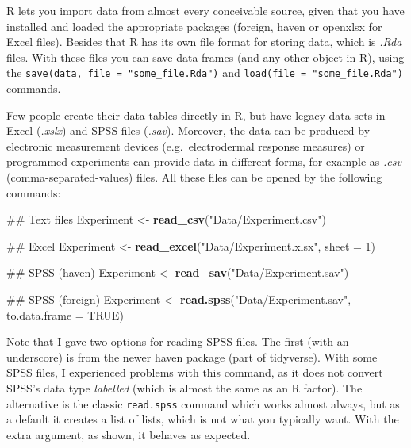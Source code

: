 \documentclass[]{svmono}
\newenvironment{Shaded}{\begin{snugshade}}{\end{snugshade}}
\newcommand{\KeywordTok}[1]{\textcolor[rgb]{0.13,0.29,0.53}{\textbf{#1}}}
\newcommand{\DataTypeTok}[1]{\textcolor[rgb]{0.13,0.29,0.53}{#1}}
\newcommand{\DecValTok}[1]{\textcolor[rgb]{0.00,0.00,0.81}{#1}}
\newcommand{\StringTok}[1]{\textcolor[rgb]{0.31,0.60,0.02}{#1}}
\newcommand{\OtherTok}[1]{\textcolor[rgb]{0.56,0.35,0.01}{#1}}
\newcommand{\NormalTok}[1]{#1}
\theoremstyle{definition}
\theoremstyle{definition}
\theoremstyle{definition}
\theoremstyle{remark}
\begin{document}
R lets you import data from almost every conceivable source, given that
you have installed and loaded the appropriate packages (foreign, haven
or openxlsx for Excel files). Besides that R has its own file format for
storing data, which is \emph{.Rda} files. With these files you can save
data frames (and any other object in R), using the
\texttt{save(data,\ file\ =\ "some\_file.Rda")} and
\texttt{load(file\ =\ "some\_file.Rda")} commands.

Few people create their data tables directly in R, but have legacy data
sets in Excel (\emph{.xslx}) and SPSS files (\emph{.sav}). Moreover, the
data can be produced by electronic measurement devices
(e.g.~electrodermal response measures) or programmed experiments can
provide data in different forms, for example as \emph{.csv}
(comma-separated-values) files. All these files can be opened by the
following commands:

\begin{Shaded}
\begin{Highlighting}[]
\NormalTok{## Text files}
\NormalTok{Experiment <-}\StringTok{ }
\StringTok{  }\KeywordTok{read_csv}\NormalTok{(}\StringTok{"Data/Experiment.csv"}\NormalTok{)}

\NormalTok{## Excel}
\NormalTok{Experiment <-}\StringTok{ }
\StringTok{  }\KeywordTok{read_excel}\NormalTok{(}\StringTok{"Data/Experiment.xlsx"}\NormalTok{, }\DataTypeTok{sheet =} \DecValTok{1}\NormalTok{)}

\NormalTok{## SPSS (haven)}
\NormalTok{Experiment <-}\StringTok{ }
\StringTok{  }\KeywordTok{read_sav}\NormalTok{(}\StringTok{"Data/Experiment.sav"}\NormalTok{)}

\NormalTok{## SPSS (foreign)}
\NormalTok{Experiment <-}
\StringTok{  }\KeywordTok{read.spss}\NormalTok{(}\StringTok{"Data/Experiment.sav"}\NormalTok{, }\DataTypeTok{to.data.frame =} \OtherTok{TRUE}\NormalTok{)}
\end{Highlighting}
\end{Shaded}

Note that I gave two options for reading SPSS files. The first (with an
underscore) is from the newer haven package (part of tidyverse). With
some SPSS files, I experienced problems with this command, as it does
not convert SPSS's data type \emph{labelled} (which is almost the same
as an R factor). The alternative is the classic \texttt{read.spss}
command which works almost always, but as a default it creates a list of
lists, which is not what you typically want. With the extra argument, as
shown, it behaves as expected.
\end{document}
